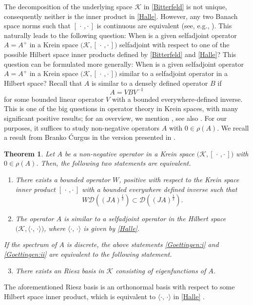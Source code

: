 \documentclass{article}
\numberwithin{equation}{section}
\newtheorem{theorem}{Theorem}[section]
\theoremstyle{definition}
\newcommand{\kip}{[\,\cdot\, , \cdot\,]}
\newcommand{\cK}{{\mathcal K}}
\newcommand{\mD}{\mathcal{D}}
\newcommand{\scalar}[2]{\langle#1,\, #2\rangle}
\newcommand{\AKone}{B}
\begin{document}
The decomposition of the underlying space $\cK$ in \eqref{Bitterfeld} is not unique, consequently neither is the inner product in \eqref{Halle}. However, any two Banach space norms such that $\kip$ is continuous are equivalent (see, e.g., \cite{La}). This naturally leads to the following question: When is a given selfadjoint operator $A=A^+$ in a Krein space $\bigl(\cK,\kip\bigr)$ selfadjoint with respect to one of the possible Hilbert space inner products defined by \eqref{Bitterfeld} and \eqref{Halle}? This question can be formulated more generally: When is a given selfadjoint operator $A=A^+$ in a Krein space $\bigl(\cK,\kip\bigr)$ similar to a selfadjoint operator in a Hilbert space? 
Recall that $A$ is similar to a densely defined operator $\AKone$ if 
\begin{equation*}
	 A=VBV^{-1}
\end{equation*}
for some bounded linear operator $V$ with a bounded everywhere-defined inverse. 
This is one of the big questions in operator theory in Krein spaces, with many significant positive results; for an overview, we mention \cite{F24}, see also \cite{CDT24}. For our purposes, it suffices to study non-negative operators $A$ with $0\in\rho(A)$. We recall a result from Branko {\'C}urgus \cite{Curgus1985} in the version presented in \cite[Theorem 2.1]{CN94}.

\begin{theorem}
\label{Goettingen}
Let $A$ be a non-negative operator in a Krein space $\bigl(\cK,\kip\bigr)$ with $0\in\rho(A)$. Then, the following two statements are equivalent.

\begin{enumerate}[label={\upshape(\roman*)}]
    \item\label{Goettingen:i}
    There exists a bounded operator $W$, positive with respect to the Krein space inner product $\kip$ with a bounded everywhere defined inverse such that
    \begin{equation*}
	W\mD\left((JA)^{\frac{1}{2}}\right)\subset \mD\left((JA)^{\frac{1}{2}}\right). 
    \end{equation*}
		
    \item\label{Goettingen:ii}
    The operator $A$ is similar to a selfadjoint operator in the Hilbert space $\bigl(\cK,\scalar{\cdot}{\cdot}\bigr)$, where $\scalar{\cdot}{\cdot}$ is given by \eqref{Halle}.
\end{enumerate}
If the spectrum of $A$ is discrete, the above statements \ref{Goettingen:i} and \ref{Goettingen:ii} are equivalent to the following statement.
\begin{enumerate}[label={\upshape(\roman*)}]
\setcounter{enumi}{2}
    \item\label{Goettingen:iii}
    There exists an Riesz basis in $\cK$ consisting of eigenfunctions of $A$.
\end{enumerate}
\end{theorem}
The aforementioned Riesz basis is an orthonormal basis with respect to some Hilbert space inner product, which is equivalent to $\scalar{\cdot}{\cdot}$ in \eqref{Halle} \cite[Chapter VI \S 2]{GK}. 
\smallskip
\end{document}
